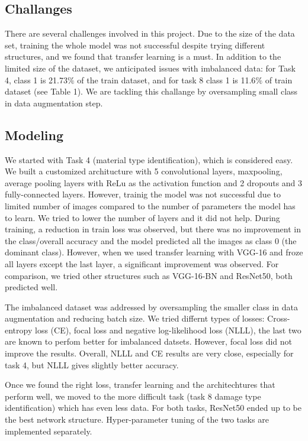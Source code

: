 \documentclass[10pt,twocolumn,letterpaper]{article}
\begin{document}
\subsection{Challanges}
There are several challenges involved in this project. Due to the size of the data set, training the whole model was not successful despite trying different structures, and we found that transfer learning is a must. In addition to the limited size of the dataset, we anticipated issues with imbalanced data: for Task 4, class 1 is 21.73$\%$ of the train dataset, and for task 8 class 1 is 11.6$\%$ of train dataset (see Table 1).  We are tackling this challange by oversampling small class in data augmentation step. 

\subsection{Modeling}
We started with Task 4 (material type identification), which is considered easy. We built a customized architucture with 5 convolutional layers, maxpooling, average pooling layers with ReLu as the activation function and 2 dropouts and 3 fully-connected layers. However, trainig the model was not successful due to limited number of images compared to the number of parameters the model has to learn. We tried to lower the number of layers and it did not help. During training, a reduction in train loss was observed, but there was no improvement in the class/overall accuracy and the model predicted all the images as class 0 (the dominant class). However, when we used transfer learning with VGG-16 and froze all layers except the last layer, a significant improvement was observed. For comparison, we tried other structures such as VGG-16-BN and ResNet50, both predicted well.

The imbalanced dataset was addressed by oversampling the smaller class in data augmentation and reducing batch size. We tried differnt types of losses: Cross-entropy loss (CE), focal loss and negative log-likelihood loss (NLLL), the last two are known to perfom better for imbalanced datsets. However, focal loss did not improve the results. Overall, NLLL and CE results are very close, especially for task 4, but NLLL gives slightly better accuracy. 

Once we found the right loss, transfer learning and the architechtures that perform well, we moved to the more difficult task (task 8 damage type identification) which has even less data. For both tasks, ResNet50 ended up to be the best network structure. Hyper-parameter tuning of the two tasks are implemented separately.
\end{document}
